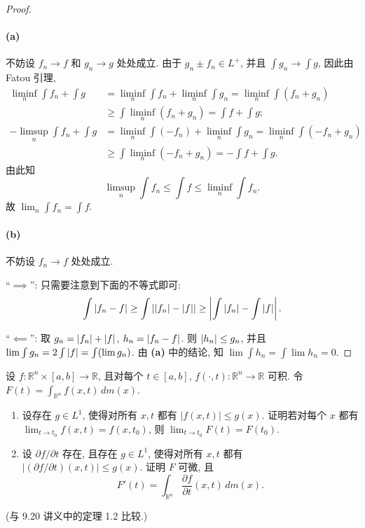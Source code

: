 \documentclass{article}
\begin{document}
\begin{proof}
	\paragraph{(a)} 不妨设 $f_n \to f$ 和 $g_n \to g$ 处处成立. 由于 $g_n \pm f_n \in L^+$, 并且 $\int g_n \to \int g$, 因此由 Fatou 引理,
	\begin{align*}
		\liminf_n \int f_n + \int g 
		&= \liminf_n \int f_n + \liminf_n \int g_n 
		= \liminf_n \int (f_n + g_n) \\
		& \ge \int \liminf_n (f_n + g_n) 
		= \int f + \int g; \\
		-\limsup_n \int f_n + \int g 
		&= \liminf_n \int (-f_n) + \liminf_n \int g_n 
		= \liminf_n \int (-f_n + g_n) \\
		& \ge \int \liminf_n (-f_n + g_n)
		= -\int f + \int g.
	\end{align*}
	由此知
	\[ \limsup_n \int f_n \le \int f \le \liminf_n \int f_n. \]
	故 $\lim_n \int f_n = \int f$.

	\paragraph{(b)} 不妨设 $f_n \to f$ 处处成立. 

	``$\implies$'': 只需要注意到下面的不等式即可:
	\[ \int \left|f_n - f\right| \ge \int \left|\left|f_n\right| - \left|f\right|\right|
	\ge \left|\int \left|f_n\right| - \int \left|f\right|\right|. \]

	``$\impliedby$'': 取 $g_n = \left|f_n\right| + \left|f\right|$, $h_n = \left|f_n - f\right|$. 则 $\left|h_n\right| \le g_n$, 并且 $\lim \int g_n = 2\int \left|f\right| = \int (\lim g_n)$. 由 \textbf{(a)} 中的结论, 知 $\lim \int h_n = \int \lim h_n = 0$.
\end{proof}



\begin{problem}
  设 $f:\mathbb{R}^n\times[a,b]\to\mathbb{R}$, 且对每个 $t\in[a,b]$, $f(\cdot,t):\mathbb{R}^n\to\mathbb{R}$ 可积. 令 $F(t)=\int_{\mathbb{R}^n}f(x,t)\,dm(x)$.
  \begin{enumerate}
    \item[(a)] 设存在 $g\in L^1$, 使得对所有 $x,t$ 都有 $|f(x,t)|\leq g(x)$. 证明若对每个 $x$ 都有 $\lim_{t\to t_0}f(x,t)=f(x,t_0)$, 则 $\lim_{t\to t_0}F(t)=F(t_0)$.
    \item[(b)] 设 $\partial f/\partial t$ 存在, 且存在 $g\in L^1$, 使得对所有 $x,t$ 都有 $|(\partial f/\partial t)(x,t)|\leq g(x)$. 证明 $F$ 可微, 且
      \[
        F'(t)=\int_{\mathbb{R}^n}\frac{\partial f}{\partial t}(x,t)\,dm(x).
      \]
  \end{enumerate}
  (与 9.20 讲义中的定理 1.2 比较.)
\end{problem}
\end{document}
